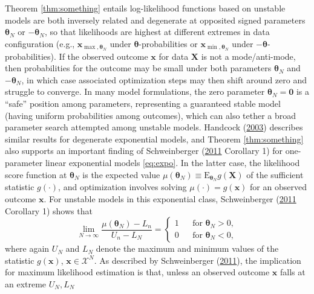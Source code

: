 \documentclass[]{article}
\theoremstyle{definition}
\begin{document}
Theorem \ref{thm:something} entails log-likelihood functions based on
unstable models are both inversely related and degenerate at opposited
signed parameters \(\boldsymbol \theta_N\) or \(-\boldsymbol \theta_N\),
so that likelihoods are highest at different extremes in data
configuration (e.g., \(\boldsymbol{x}_{\max, \boldsymbol \theta_N}\)
under \(\boldsymbol \theta\)-probabilities or
\(\boldsymbol{x}_{\min, \boldsymbol \theta_N}\) under
\(-\boldsymbol \theta\)-probabilities). If the observed outcome
\(\boldsymbol x\) for data \(\boldsymbol X\) is not a mode/anti-mode,
then probabilities for the outcome may be small under both parameters
\(\boldsymbol \theta_N\) and \(-\boldsymbol \theta_N\), in which case
associated optimization steps may then shift around zero and struggle to
converge. In many model formulations, the zero parameter
\(\boldsymbol \theta_N=\boldsymbol 0\) is a ``safe'' position among
parameters, representing a guaranteed stable model (having uniform
probabilities among outcomes), which can also tether a broad parameter
search attempted among unstable models. Handcock
(\protect\hyperlink{ref-handcock2003assessing}{2003}) describes similar
results for degenerate exponential models, and Theorem
\ref{thm:something} also supports an important finding of Schweinberger
(\protect\hyperlink{ref-schweinberger2011instability}{2011} Corollary 1)
for one-parameter linear exponential models \eqref{eq:expo}. In the latter
case, the likelihood score function at \(\boldsymbol \theta_N\) is the
expected value
\(\mu(\boldsymbol \theta_N)\equiv \mathrm{E}_{\boldsymbol \theta_N} g(\boldsymbol X)\)
of the sufficient statistic \(g(\cdot)\), and optimization involves
solving \(\mu(\cdot)=g(\boldsymbol x)\) for an observed outcome
\(\boldsymbol x\). For unstable models in this exponential class,
Schweinberger
(\protect\hyperlink{ref-schweinberger2011instability}{2011} Corollary 1)
shows that \[
\lim_{N\to \infty}\frac{\mu(\boldsymbol \theta_N) -L_n}{U_n-L_N}= \left\{ \begin{array}{lcl}
1 && \text{for } \boldsymbol \theta_N>0,\\
0 && \text{for } \boldsymbol \theta_N<0, \end{array}\right.
\] where again \(U_N\) and \(L_N\) denote the maximum and minimum values
of the statistic \(g(\boldsymbol x)\),
\(\boldsymbol x\in\mathcal{X}^N\). As described by Schweinberger
(\protect\hyperlink{ref-schweinberger2011instability}{2011}), the
implication for maximum likelihood estimation is that, unless an
observed outcome \(\boldsymbol x\) falls at an extreme \(U_N, L_N\)
\end{document}
